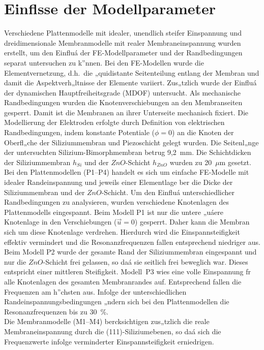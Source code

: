 \section{Einflsse der Modellparameter}
\label{piezomodell}

Verschiedene Plattenmodelle mit idealer, unendlich steifer Einspannung
und dreidimensionale Membranmodelle mit realer Membraneinspannung
wurden erstellt, um den Einfluá der FE-Modellparameter und der
Randbedingungen separat untersuchen zu k”nnen.
Bei den FE-Modellen wurde die Elementvernetzung, d.h.\ die „quidistante
Seitenteilung entlang der Membran und damit die Aspektverh„ltnisse der
Elemente variiert. Zus„tzlich wurde der Einfluá der dynamischen
Hauptfreiheitsgrade (MDOF) untersucht. Als mechanische Randbedingungen
wurden die Knotenverschiebungen an den Membranseiten gesperrt. Damit ist
die Membranen an ihrer Unterseite mechanisch fixiert. Die Modellierung
der Elektroden erfolgte durch Definition von elektrischen Randbedingungen,
indem konstante Potentiale ($\phi = 0$) an die Knoten der Oberfl„che der
Siliziummembran und Piezoschicht gelegt wurden. Die Seitenl„nge der
untersuchten Silizium-Bimorphmembran betrug 9,2~mm. Die Schichtdicken
der Siliziummembran $h_{Si}$ und der $ZnO$-Schicht $h_{ZnO}$ wurden
zu 20~$\mu$m gesetzt.\\
%
Bei den Plattenmodellen (P1--P4) handelt es sich um einfache FE-Modelle
mit idealer Randeinspannung und jeweils einer Elementlage ber die Dicke
der Siliziummembran und der $ZnO$-Schicht.
Um den Einfluá unterschiedlicher Randbedingungen zu analysieren, wurden
verschiedene Knotenlagen des Plattenmodells eingespannt. Beim Modell P1 ist
nur die untere „uáere Knotenlage in den Verschiebungen ($\vec u=0$) gesperrt.
Daher kann die Membran sich um diese Knotenlage verdrehen. Hierdurch wird
die Einspannsteifigkeit effektiv vermindert und die Resonanzfrequenzen
fallen entsprechend niedriger aus. Beim Modell P2 wurde der gesamte Rand der
Siliziummembran eingespannt und nur die $ZnO$-Schicht frei gelassen, so daá
sie seitlich frei beweglich war. Dieses entspricht einer mittleren
Steifigkeit. Modell~P3 wies eine volle Einspannung fr alle Knotenlagen des
gesamten Membranrandes auf. Entsprechend fallen die Frequenzen am h”chsten
aus. Infolge der unterschiedlichen Randeinspannungsbedingungen „ndern sich
bei den Plattenmodellen die Resonanzfrequenzen bis zu 30~\%. \\
%
Die Membranmodelle (M1--M4) bercksichtigen zus„tzlich die reale
Membraneinspannung durch die (111)-Siliziumebenen, so daá sich die
Frequenzwerte infolge verminderter Einspannsteifigkeit erniedrigen.
